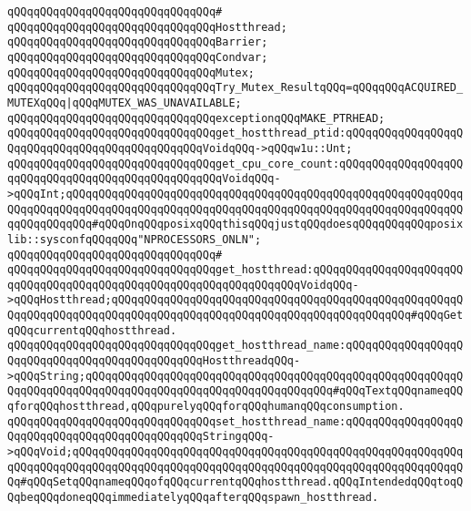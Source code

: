 \verb|qQQqqQQqqQQqqQQqqQQqqQQqqQQqqQQq#|\newline
\verb|qQQqqQQqqQQqqQQqqQQqqQQqqQQqqQQqHostthread;|\newline
\verb|qQQqqQQqqQQqqQQqqQQqqQQqqQQqqQQqBarrier;|\newline
\verb|qQQqqQQqqQQqqQQqqQQqqQQqqQQqqQQqCondvar;|\newline
\verb|qQQqqQQqqQQqqQQqqQQqqQQqqQQqqQQqMutex;|\newline
\newline
\verb|qQQqqQQqqQQqqQQqqQQqqQQqqQQqqQQqTry_Mutex_ResultqQQq=qQQqqQQqACQUIRED_MUTEXqQQq|\verb#|qQQqMUTEX_WAS_UNAVAILABLE;#\newline
\newline
\verb|qQQqqQQqqQQqqQQqqQQqqQQqqQQqqQQqexceptionqQQqMAKE_PTRHEAD;|\newline
\newline
\verb|qQQqqQQqqQQqqQQqqQQqqQQqqQQqqQQqget_hostthread_ptid:qQQqqQQqqQQqqQQqqQQqqQQqqQQqqQQqqQQqqQQqqQQqqQQqVoidqQQq->qQQqw1u::Unt;|\newline
\verb|qQQqqQQqqQQqqQQqqQQqqQQqqQQqqQQqget_cpu_core_count:qQQqqQQqqQQqqQQqqQQqqQQqqQQqqQQqqQQqqQQqqQQqqQQqqQQqVoidqQQq->qQQqInt;qQQqqQQqqQQqqQQqqQQqqQQqqQQqqQQqqQQqqQQqqQQqqQQqqQQqqQQqqQQqqQQqqQQqqQQqqQQqqQQqqQQqqQQqqQQqqQQqqQQqqQQqqQQqqQQqqQQqqQQqqQQqqQQqqQQqqQQqqQQqqQQq#qQQqOnqQQqposixqQQqthisqQQqjustqQQqdoesqQQqqQQqqQQqposixlib::sysconfqQQqqQQq"NPROCESSORS_ONLN";|\newline
\verb|qQQqqQQqqQQqqQQqqQQqqQQqqQQqqQQq#|\newline
\verb|qQQqqQQqqQQqqQQqqQQqqQQqqQQqqQQqget_hostthread:qQQqqQQqqQQqqQQqqQQqqQQqqQQqqQQqqQQqqQQqqQQqqQQqqQQqqQQqqQQqqQQqqQQqVoidqQQq->qQQqHostthread;qQQqqQQqqQQqqQQqqQQqqQQqqQQqqQQqqQQqqQQqqQQqqQQqqQQqqQQqqQQqqQQqqQQqqQQqqQQqqQQqqQQqqQQqqQQqqQQqqQQqqQQqqQQqqQQqqQQq#qQQqGetqQQqcurrentqQQqhostthread.|\newline
\verb|qQQqqQQqqQQqqQQqqQQqqQQqqQQqqQQqget_hostthread_name:qQQqqQQqqQQqqQQqqQQqqQQqqQQqqQQqqQQqqQQqqQQqqQQqHostthreadqQQq->qQQqString;qQQqqQQqqQQqqQQqqQQqqQQqqQQqqQQqqQQqqQQqqQQqqQQqqQQqqQQqqQQqqQQqqQQqqQQqqQQqqQQqqQQqqQQqqQQqqQQqqQQqqQQqqQQq#qQQqTextqQQqnameqQQqforqQQqhostthread,qQQqpurelyqQQqforqQQqhumanqQQqconsumption.|\newline
\verb|qQQqqQQqqQQqqQQqqQQqqQQqqQQqqQQqset_hostthread_name:qQQqqQQqqQQqqQQqqQQqqQQqqQQqqQQqqQQqqQQqqQQqqQQqStringqQQq->qQQqVoid;qQQqqQQqqQQqqQQqqQQqqQQqqQQqqQQqqQQqqQQqqQQqqQQqqQQqqQQqqQQqqQQqqQQqqQQqqQQqqQQqqQQqqQQqqQQqqQQqqQQqqQQqqQQqqQQqqQQqqQQqqQQqqQQqqQQq#qQQqSetqQQqnameqQQqofqQQqcurrentqQQqhostthread.qQQqIntendedqQQqtoqQQqbeqQQqdoneqQQqimmediatelyqQQqafterqQQqspawn_hostthread.|\newline
